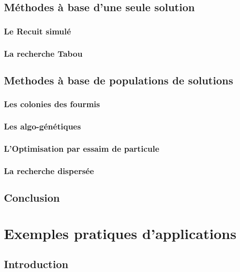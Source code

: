 \documentclass[a4paper,11pt,oneside]{report}
\theoremstyle{plain}
\newcommand{\0}{/ \! \! \! 0}
\theoremstyle{plain}
\begin{document}
\section{M\'ethodes \`a base d'une seule solution}

\subsection{Le Recuit simul\'e}

\subsection{La recherche Tabou}

\section{Methodes \`a base de populations de solutions}

\subsection{Les colonies des fourmis}

\subsection{Les algo-g\'en\'etiques}

\subsection{L'Optimisation par essaim de particule}

\subsection{La recherche dispers\'ee}

\section{Conclusion}

\chapter{Exemples pratiques d'applications}
\section{Introduction}
\end{document}
